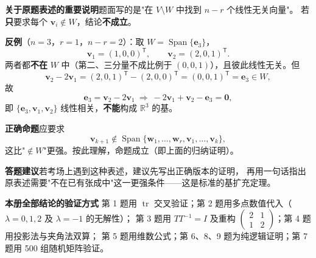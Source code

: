\documentclass[11pt]{ctexart}
\newcommand{\Rr}{\mathbb{R}}
\newcommand{\Span}{\operatorname{Span}}
\newcommand{\tr}{\operatorname{tr}}
\newcommand{\TT}{^{\mathsf T}}
\newcommand{\bv}[1]{\begin{pmatrix}#1\end{pmatrix}}
\begin{document}
\begin{warnbox}
\textbf{关于原题表述的重要说明}\quad 题面写的是"在 $V\setminus W$ 中找到 $n-r$ 个线性无关向量"。
若\textbf{只}要求每个 $\mathbf v_i\notin W$，结论\textbf{不成立}。

\textbf{反例}（$n=3$，$r=1$，$n-r=2$）：取 $W=\Span\{\mathbf e_3\}$，
\[
\mathbf v_1=(1,0,0)\TT,\qquad \mathbf v_2=(2,0,1)\TT .
\]
两者都\textbf{不在} $W$ 中（第二、三分量不成比例于 $(0,0,1)$），且彼此线性无关。但
\[
\mathbf v_2-2\mathbf v_1=(2,0,1)\TT-(2,0,0)\TT=(0,0,1)\TT=\mathbf e_3\in W ,
\]
故
\[
\mathbf e_3=\mathbf v_2-2\mathbf v_1\ \Longrightarrow\ -2\mathbf v_1+\mathbf v_2-\mathbf e_3=\mathbf 0 ,
\]
即 $\{\mathbf e_3,\mathbf v_1,\mathbf v_2\}$ 线性相关，\textbf{不能}构成 $\Rr^3$ 的基。

\textbf{正确命题}\quad 应要求
\[
\mathbf v_{k+1}\notin\Span\{\mathbf w_1,\dots,\mathbf w_r,\mathbf v_1,\dots,\mathbf v_k\},
\]
这比"$\notin W$"更强。按此理解，命题成立（即上面的归纳证明）。

\textbf{答题建议}\quad 若考场上遇到这种表述，建议先写出正确版本的证明，
再用一句话指出原表述需要"不在已有张成中"这一更强条件——这是标准的基扩充定理。
\end{warnbox}

\vspace{0.3cm}
\begin{keybox}
\textbf{本册全部结论的验证方式}\quad
第 1 题用 $\tr$ 交叉验证；第 2 题用多点数值代入（$\lambda=0,1,2$ 及 $\lambda=-1$ 的无解性）；
第 3 题用 $TT^{-1}=I$ 及重构 $\bv{2&1\\1&2}$；第 4 题用投影法与夹角法双算；
第 5 题用维数公式；第 6、8、9 题为纯逻辑证明；第 7 题用 500 组随机矩阵验证。
\end{keybox}
\end{document}
